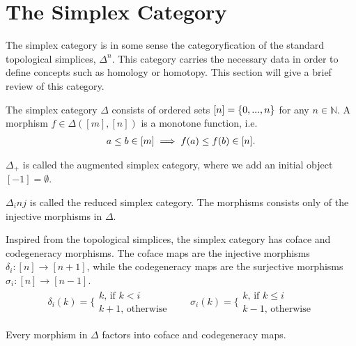 \documentclass[../thesis.tex]{subfiles}
\begin{document}
    \section{The Simplex Category}
        The simplex category is in some sense the categoryfication of the standard topological simplices, $\Delta^n$. This category carries the necessary data in order to define concepts such as homology or homotopy. This section will give a brief review of this category.

        \begin{definition}
            The simplex category $\Delta$ consists of ordered sets $[n] = \startset{0,...,n}$ for any $n\in\mathbb{N}$. A morphism $f\in\Delta([m],[n])$ is a monotone function, i.e.
            \begin{align*}
              a\leq b \in [m] \implies f(a) \leq f(b) \in [n]\tt{.}  
            \end{align*}
        \end{definition}

        \begin{definition}
            $\Delta_+$ is called the augmented simplex category, where we add an initial object $[-1] = \emptyset$.
        \end{definition}

        \begin{definition}
            $\Delta_inj$ is called the reduced simplex category. The morphisms consists only of the injective morphisms in $\Delta$.
        \end{definition}

        Inspired from the topological simplices, the simplex category has coface and codegeneracy morphisms. The coface maps are the injective morphisms $\delta_i : [n] \rightarrow [n+1]$, while the codegeneracy maps are the surjective morphisms $\sigma_i: [n] \rightarrow [n-1]$.
        \begin{align*}
            \delta_i(k) = \biggl\{\substack{k\text{, if }k<i \\ k+1\text{, otherwise}} \qquad
            \sigma_i(k) = \biggl\{\substack{k\text{, if }k\leq i \\ k-1\text{, otherwise}}
        \end{align*}

        \begin{proposition}
            Every morphism in $\Delta$ factors into coface and codegeneracy maps.
        \end{proposition}
\end{document}
